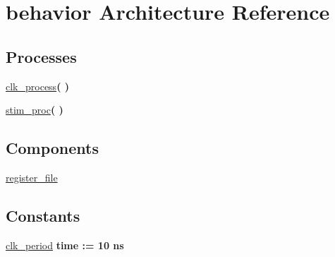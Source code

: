 \hypertarget{classregister__file__tb_1_1behavior}{\section{behavior \-Architecture \-Reference}
\label{classregister__file__tb_1_1behavior}
}
\*
\*
\subsection*{\-Processes}
 \begin{DoxyCompactItemize}
\item 
\hypertarget{classregister__file__tb_1_1behavior_ac5bb218131b813f7908ec89476b31fca}{\hyperlink{classregister__file__tb_1_1behavior_ac5bb218131b813f7908ec89476b31fca}{clk\-\_\-process}{\bfseries  (  )}}\label{classregister__file__tb_1_1behavior_ac5bb218131b813f7908ec89476b31fca}

\item 
\hypertarget{classregister__file__tb_1_1behavior_ad2efa6785cff833c341e27596b21aeb5}{\hyperlink{classregister__file__tb_1_1behavior_ad2efa6785cff833c341e27596b21aeb5}{stim\-\_\-proc}{\bfseries  (  )}}\label{classregister__file__tb_1_1behavior_ad2efa6785cff833c341e27596b21aeb5}

\end{DoxyCompactItemize}
\subsection*{\-Components}
 \begin{DoxyCompactItemize}
\item 
\hypertarget{classregister__file__tb_1_1behavior_a30c07c12ac7de69a43a0ab69d9b489c8}{\hyperlink{classregister__file__tb_1_1behavior_a30c07c12ac7de69a43a0ab69d9b489c8}{register\-\_\-file}  {\bfseries }  }\label{classregister__file__tb_1_1behavior_a30c07c12ac7de69a43a0ab69d9b489c8}

\end{DoxyCompactItemize}
\subsection*{\-Constants}
 \begin{DoxyCompactItemize}
\item 
\hypertarget{classregister__file__tb_1_1behavior_af0873cae5a748f5df114f8d3add8cafe}{\hyperlink{classregister__file__tb_1_1behavior_af0873cae5a748f5df114f8d3add8cafe}{clk\-\_\-period} {\bfseries time  \-:=  10  ns } }\label{classregister__file__tb_1_1behavior_af0873cae5a748f5df114f8d3add8cafe}

\end{DoxyCompactItemize}
